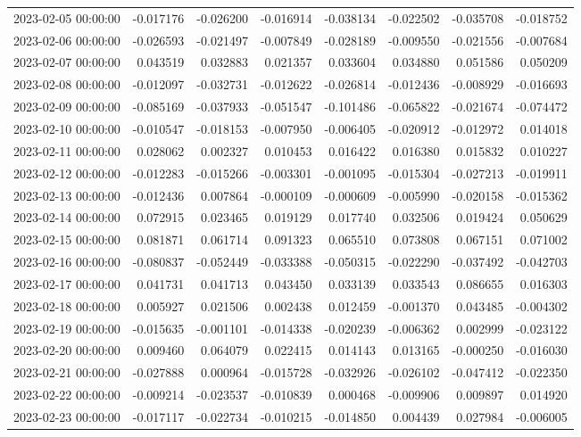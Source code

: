 \begin{tabular}{lrrrrrrr}
2023-02-05 00:00:00 & -0.017176 & -0.026200 & -0.016914 & -0.038134 & -0.022502 & -0.035708 & -0.018752 \\
2023-02-06 00:00:00 & -0.026593 & -0.021497 & -0.007849 & -0.028189 & -0.009550 & -0.021556 & -0.007684 \\
2023-02-07 00:00:00 & 0.043519 & 0.032883 & 0.021357 & 0.033604 & 0.034880 & 0.051586 & 0.050209 \\
2023-02-08 00:00:00 & -0.012097 & -0.032731 & -0.012622 & -0.026814 & -0.012436 & -0.008929 & -0.016693 \\
2023-02-09 00:00:00 & -0.085169 & -0.037933 & -0.051547 & -0.101486 & -0.065822 & -0.021674 & -0.074472 \\
2023-02-10 00:00:00 & -0.010547 & -0.018153 & -0.007950 & -0.006405 & -0.020912 & -0.012972 & 0.014018 \\
2023-02-11 00:00:00 & 0.028062 & 0.002327 & 0.010453 & 0.016422 & 0.016380 & 0.015832 & 0.010227 \\
2023-02-12 00:00:00 & -0.012283 & -0.015266 & -0.003301 & -0.001095 & -0.015304 & -0.027213 & -0.019911 \\
2023-02-13 00:00:00 & -0.012436 & 0.007864 & -0.000109 & -0.000609 & -0.005990 & -0.020158 & -0.015362 \\
2023-02-14 00:00:00 & 0.072915 & 0.023465 & 0.019129 & 0.017740 & 0.032506 & 0.019424 & 0.050629 \\
2023-02-15 00:00:00 & 0.081871 & 0.061714 & 0.091323 & 0.065510 & 0.073808 & 0.067151 & 0.071002 \\
2023-02-16 00:00:00 & -0.080837 & -0.052449 & -0.033388 & -0.050315 & -0.022290 & -0.037492 & -0.042703 \\
2023-02-17 00:00:00 & 0.041731 & 0.041713 & 0.043450 & 0.033139 & 0.033543 & 0.086655 & 0.016303 \\
2023-02-18 00:00:00 & 0.005927 & 0.021506 & 0.002438 & 0.012459 & -0.001370 & 0.043485 & -0.004302 \\
2023-02-19 00:00:00 & -0.015635 & -0.001101 & -0.014338 & -0.020239 & -0.006362 & 0.002999 & -0.023122 \\
2023-02-20 00:00:00 & 0.009460 & 0.064079 & 0.022415 & 0.014143 & 0.013165 & -0.000250 & -0.016030 \\
2023-02-21 00:00:00 & -0.027888 & 0.000964 & -0.015728 & -0.032926 & -0.026102 & -0.047412 & -0.022350 \\
2023-02-22 00:00:00 & -0.009214 & -0.023537 & -0.010839 & 0.000468 & -0.009906 & 0.009897 & 0.014920 \\
2023-02-23 00:00:00 & -0.017117 & -0.022734 & -0.010215 & -0.014850 & 0.004439 & 0.027984 & -0.006005 \\

\end{tabular}
